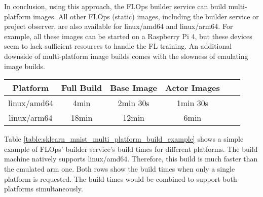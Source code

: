 In conclusion, using this approach, the FLOps builder service can build multi-platform images.
All other FLOps (static) images, including the builder service or project observer, are also available for linux/amd64 and linux/arm64.
For example, all these images can be started on a Raspberry Pi 4, but these devices seem to lack sufficient resources to handle the FL training.
An additional downside of multi-platform image builds comes with the slowness of emulating image builds.
\begin{changemargin}{0cm}{0cm}
    \centering
    \begin{tabular}{|c|c|c|c|c|c|}
        \hline
            \textbf{Platform} & \textbf{Full Build} & \textbf{Base Image} & \textbf{Actor Images} \\
        \hline
            linux/amd64 & 4min & 2min 30s & 1min 30s \\
        \hline
            linux/arm64 & 18min & 12min & 6min 
        \\
        \hline
    \end{tabular}
    \label{table:sklearn_mnist_multi_platform_build_example}
\end{changemargin}
Table \ref{table:sklearn_mnist_multi_platform_build_example} shows a simple example of FLOps' builder service's build times for different platforms.
The build machine natively supports linux/amd64.
Therefore, this build is much faster than the emulated arm one.
Both rows show the build times when only a single platform is requested.
The build times would be combined to support both platforms simultaneously.
